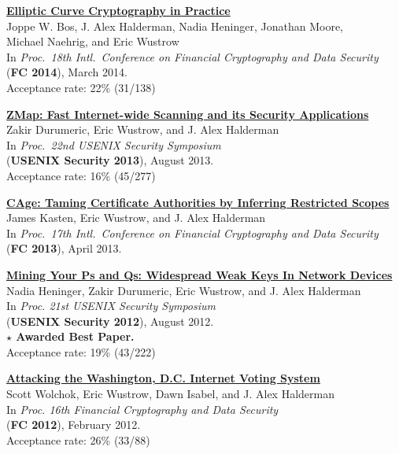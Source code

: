 \documentclass[margin,11pt]{res} %
\begin{document}
    \textbf{\href{http://eprint.iacr.org/2013/734}{Elliptic Curve Cryptography in Practice}} \\
    Joppe W. Bos, J. Alex Halderman, Nadia Heninger, Jonathan Moore,\\ Michael Naehrig, and Eric Wustrow \\
    In \emph{Proc.\ 18th Intl.\ Conference on Financial Cryptography and Data Security} \\
    (\textbf{FC 2014}), March 2014. \\
    Acceptance rate: 22\% (31/138)

    \textbf{\href{https://zmap.io/paper.html}{ZMap: Fast Internet-wide Scanning and its Security Applications}} \\
    Zakir Durumeric, Eric Wustrow, and J. Alex Halderman \\
    In \emph{Proc.\ 22nd USENIX Security Symposium} \\
    (\textbf{USENIX Security 2013}), August 2013. \\
    Acceptance rate: 16\% (45/277)


\newpage
    \textbf{\href{https://jhalderm.com/pub/papers/cage-fc13.pdf}{CAge: Taming Certificate Authorities by Inferring Restricted Scopes}} \\
    James Kasten, Eric Wustrow, and J. Alex Halderman \\
    In \emph{Proc.\ 17th Intl.\ Conference on Financial Cryptography and Data Security} \\
    (\textbf{FC 2013}), April 2013.

    \textbf{\href{https://factorable.net/weakkeys12.conference.pdf}{Mining Your Ps and Qs: Widespread Weak Keys In Network Devices}} \\
    Nadia Heninger, Zakir Durumeric, Eric Wustrow, and J. Alex Halderman \\
    In \emph{Proc. 21st USENIX Security Symposium} \\
    (\textbf{USENIX Security 2012}), August 2012. \\
    \textbf{$\star$ Awarded Best Paper.} \\
    Acceptance rate: 19\% (43/222)

    \textbf{\href{https://ericw.us/trow/dc-internet-voting-fc.pdf}{Attacking the Washington, D.C. Internet Voting System}} \\
    Scott Wolchok, Eric Wustrow, Dawn Isabel, and J. Alex Halderman \\
    In \emph{Proc. 16th Financial Cryptography and Data Security} \\
    (\textbf{FC 2012}), February 2012. \\
    Acceptance rate: 26\% (33/88)
\end{document}
